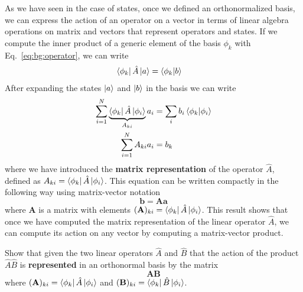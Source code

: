 \documentclass[../Main/chem532-notes.tex]{subfiles}
\begin{document}
As we have seen in the case of states, once we defined an orthonormalized basis, we can express the action of an operator on a vector in terms of linear algebra operations on matrix and vectors that represent operators and states.
If we compute the inner product of a generic element of the basis $\phi_k$ with Eq.~\eqref{eq:bg:operator}, we can write
\begin{equation}
\begin{split}
\bra{\phi_k}\hat{A} \ket{a} &= \braket{\phi_k | b}
\end{split}
\end{equation}
After expanding the states $\ket{a}$ and $\ket{b}$ in the basis we can write
\begin{equation}
\begin{split}
\sum_{i = 1}^N \underbrace{\bra{\phi_k}\hat{A} \ket{\phi_i}}_{A_{ki} } a_i &= \sum_i b_i \braket{\phi_k | \phi_i} \\
\sum_{i = 1}^N A_{ki} a_i&= b_k
\end{split}
\end{equation}
where we have introduced the \textbf{matrix representation} of the operator $\hat{A}$, defined as $A_{ki} = \bra{\phi_k}\hat{A} \ket{\phi_i}$.
This equation can be written compactly in the following way using matrix-vector notation
\begin{equation}
\mathbf{b} = \mathbf{A} \mathbf{a}
\end{equation}
where $\mathbf{A}$ is a matrix with elements $(\mathbf{A})_{ki} = \bra{\phi_k}\hat{A} \ket{\phi_i}$.
This result shows that once we have computed the matrix representation of the linear operator $\hat{A}$, we can compute its action on any vector by computing a matrix-vector product.

\begin{problem}
Show that given the two linear operators $\hat{A}$ and $\hat{B}$ that the action of the product $\hat{A} \hat{B}$ is \textbf{represented} in an orthonormal basis by the matrix
\begin{equation}
\mathbf{A} \mathbf{B}
\end{equation}
where 
$(\mathbf{A})_{ki} = \bra{\phi_k}\hat{A} \ket{\phi_i}$ and $(\mathbf{B})_{ki} = \bra{\phi_k}\hat{B} \ket{\phi_i}$.
\end{problem}
\end{document}
